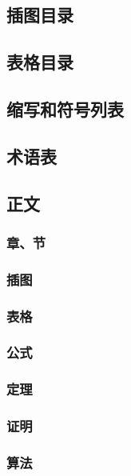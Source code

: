 \subsection{插图目录}

\subsection{表格目录}

\subsection{缩写和符号列表}

\subsection{术语表}

\subsection{正文}

\subsubsection{章、节}

\subsubsection{插图}

\subsubsection{表格}

\subsubsection{公式}

\subsubsection{定理}

\subsubsection{证明}

\subsubsection{算法}


